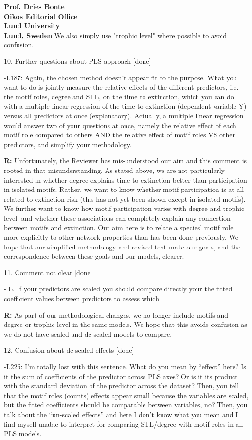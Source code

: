 \documentclass[12pt]{letter}
\begin{document}
\begin{letter}{\bf Prof. Dries Bonte\\
Oikos Editorial Office \\
Lund University \\
Lund, Sweden}
      We also simply use "trophic level" where possible to avoid confusion.

    10. Further questions about PLS approach [done]

        -L187: Again, the chosen method doesn't appear fit to the purpose. What you want to do is jointly measure the relative effects of the different predictors, i.e. the motif roles, degree and STL, on the time to extinction, which you can do with a multiple linear regression of the time to extinction (dependent variable Y) versus all predictors at once (explanatory). Actually, a multiple linear regression would answer two of your questions at once, namely the relative effect of each motif role compared to others AND the relative effect of motif roles VS other predictors, and simplify your methodology.
        
        \textbf{R:} Unfortunately, the Reviewer has mis-understood our aim and this comment is rooted in that misunderstanding.
        As stated above, we are not particularly interested in whether degree explains time to extinction better than participation in isolated motifs.
        Rather, we want to know whether motif participation is at all related to extinction risk (this has not yet been shown except in isolated motifs).
        We further want to know how motif participation varies with degree and trophic level, and whether these associations can completely explain any connection between motifs and extinction. 
        Our aim here is to relate a species' motif role more explicitly to other network properties than has been done previously.
        We hope that our simplified methodology and revised text make our goals, and the correspondence between these goals and our models, clearer.


    11. Comment not clear [done]
        
        - L. If your predictors are scaled you should compare directly your the fitted coefficient values between predictors to assess which
        
        \textbf{R:} As part of our methodological changes, we no longer include motifs and degree or trophic level in the same models. We hope that this avoids confusion as we do not have scaled and de-scaled models to compare.


    12. Confusion about de-scaled effects [done]

        -L225: I’m totally lost with this sentence. What do you mean by ``effect'' here? Is it the sum of coefficients of the predictor across PLS axes? Or is it its product with the standard deviation of the predictor across the dataset? Then, you tell that the motif roles (counts) effects appear small because the variables are scaled, but the fitted coefficients should be comparable between variables, no?  Then, you talk about the ``un-scaled effects'' and here I don’t know what you mean and I find myself unable to interpret for comparing STL/degree with motif roles in all PLS models.
        

\end{letter}
\end{document}
